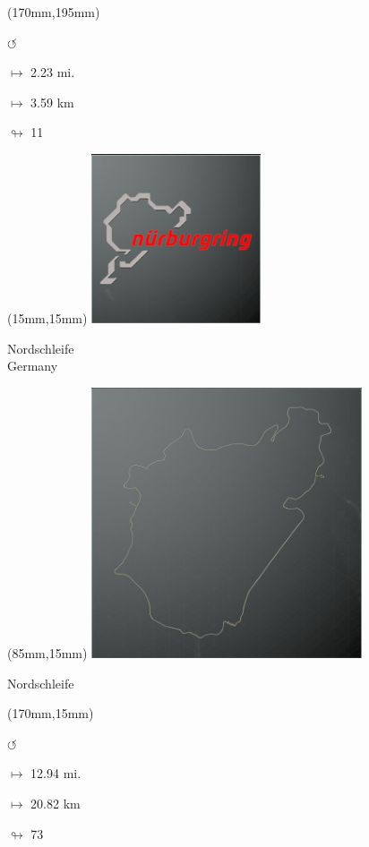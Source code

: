 \begin{textblock*}{30mm}(170mm,195mm)%
\par \Huge$\circlearrowleft$
\Large
\par$\mapsto$ 2.23 mi.
\par$\mapsto$ 3.59 km
\par$\looparrowright$ 11
\end{textblock*}
\null\newpage

\begin{textblock*}{60mm}(15mm,15mm)%
\includegraphics[width=50mm]{LG/2015-05-20_00088.png}
\par Nordschleife\\ Germany
\end{textblock*}
\begin{textblock*}{80mm}(85mm,15mm)%
\includegraphics[width=80mm]{TR/2015-05-20_00037.png}
\centerline{Nordschleife}
\end{textblock*}
\begin{textblock*}{30mm}(170mm,15mm)%
\par \Huge$\circlearrowleft$
\Large
\par$\mapsto$ 12.94 mi.
\par$\mapsto$ 20.82 km
\par$\looparrowright$ 73
\end{textblock*}
